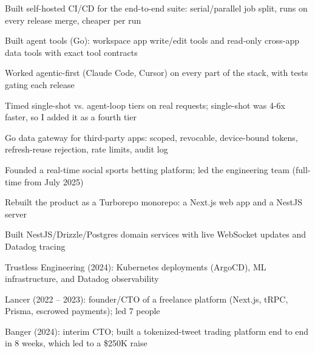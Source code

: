 \documentclass[print]{jack-resume}
\begin{document}
\begin{tightemize}
    \item Built self-hosted CI/CD for the end-to-end suite: serial/parallel job split, runs on every release merge, cheaper per run
    \item Built agent tools (Go): workspace app write/edit tools and read-only cross-app data tools with exact tool contracts
    \item Worked agentic-first (Claude Code, Cursor) on every part of the stack, with tests gating each release
    \item Timed single-shot vs. agent-loop tiers on real requests; single-shot was 4-6x faster, so I added it as a fourth tier
    \item Go data gateway for third-party apps: scoped, revocable, device-bound tokens, refresh-reuse rejection, rate limits, audit log
\end{tightemize}
\sectionsep

\begin{tightemize}
    \item Founded a real-time social sports betting platform; led the engineering team (full-time from July 2025)
    \item Rebuilt the product as a Turborepo monorepo: a Next.js web app and a NestJS server
    \item Built NestJS/Drizzle/Postgres domain services with live WebSocket updates and Datadog tracing
\end{tightemize}
\sectionsep

\begin{tightemize}
    \item Trustless Engineering (2024): Kubernetes deployments (ArgoCD), ML infrastructure, and Datadog observability
    \item Lancer (2022 -- 2023): founder/CTO of a freelance platform (Next.js, tRPC, Prisma, escrowed payments); led 7 people
    \item Banger (2024): interim CTO; built a tokenized-tweet trading platform end to end in 8 weeks, which led to a \$250K raise
\end{tightemize}
\sectionsep
\end{document}

